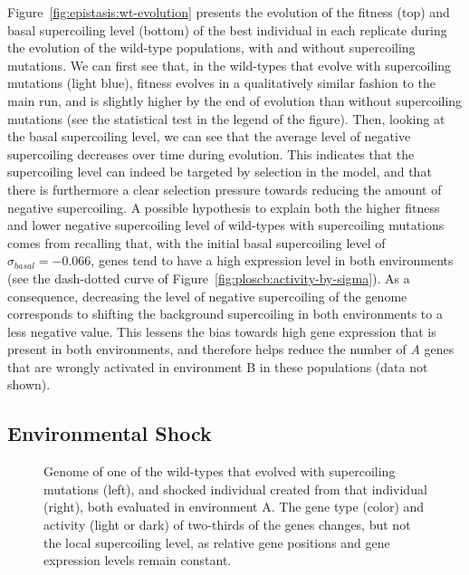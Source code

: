 Figure~\ref{fig:epistasis:wt-evolution} presents the evolution of the fitness (top) and basal supercoiling level (bottom) of the best individual in each replicate during the evolution of the wild-type populations, with and without supercoiling mutations.
We can first see that, in the wild-types that evolve with supercoiling mutations (light blue), fitness evolves in a qualitatively similar fashion to the main run, and is slightly higher by the end of evolution than without supercoiling mutations (see the statistical test in the legend of the figure).
Then, looking at the basal supercoiling level, we can see that the average level of negative supercoiling decreases over time during evolution.
This indicates that the supercoiling level can indeed be targeted by selection in the model, and that there is furthermore a clear selection pressure towards reducing the amount of negative supercoiling.
A possible hypothesis to explain both the higher fitness and lower negative supercoiling level of wild-types with supercoiling mutations comes from recalling that, with the initial basal supercoiling level of $\sigma_{basal} = -0.066$, genes tend to have a high expression level in both environments (see the dash-dotted curve of Figure~\ref{fig:ploscb:activity-by-sigma}).
As a consequence, decreasing the level of negative supercoiling of the genome corresponds to shifting the background supercoiling in both environments to a less negative value.
This lessens the bias towards high gene expression that is present in both environments, and therefore helps reduce the number of \emph{A} genes that are wrongly activated in environment B in these populations (data not shown).

\subsection{Environmental Shock}

\begin{figure}
\centering
\begin{elasticrow}[width=\textwidth]
\end{elasticrow}
\caption[Evolved wild-type individual before and after an environmental shock]{Genome of one of the wild-types that evolved with supercoiling mutations (left), and shocked individual created from that individual (right), both evaluated in environment A.
The gene type (color) and activity (light or dark) of two-thirds of the genes changes, but not the local supercoiling level, as relative gene positions and gene expression levels remain constant.}
\label{fig:epistasis:shock}
\end{figure}

